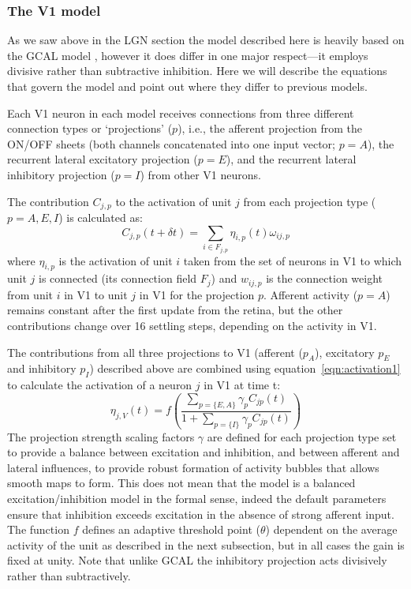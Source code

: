 \subsubsection*{The V1 model}

As we saw above in the LGN section the model described here is heavily
based on the GCAL model \citep{Stevens2013}, however it does differ in
one major respect---it employs divisive rather than subtractive
inhibition. Here we will describe the equations that govern the model
and point out where they differ to previous models.

Each V1 neuron in each model receives connections from three different
connection types or `projections' ($p$), i.e., the afferent projection
from the ON/OFF sheets (both channels concatenated into one input
vector; $p=A$), the recurrent lateral excitatory projection ($p=E$),
and the recurrent lateral inhibitory projection ($p=I$) from other V1
neurons.

The contribution $C_{j,p}$ to the activation of unit $j$ from each
projection type ($p=A,E,I$) is calculated as:
\begin{equation}
C_{j,p}(t+\delta t)=\sum_{i\in F_{j,p}}\eta_{i, p}(t)\omega_{ij,p}
\label{eqn:update}
\end{equation}
where $\eta_{i, p}$ is the activation of unit $i$ taken from the set
of neurons in V1 to which unit $j$ is connected (its connection field
$F_j$) and $w_{ij,p}$ is the connection weight from unit $i$ in V1 to
unit $j$ in V1 for the projection $p$. Afferent activity ($p=A$)
remains constant after the first update from the retina, but the other
contributions change over 16 settling steps, depending on the activity
in V1.

The contributions from all three projections to V1 (afferent
($p_{A}$), excitatory $p_{E}$ and inhibitory $p_{I}$) described above
are combined using equation~\ref{eqn:activation1} to calculate the
activation of a neuron $j$ in V1 at time t:
\begin{equation}
\eta_{j,V}(t)=f\left(\frac{\sum_{p=\{E, A\}}\gamma_{p}C_{jp}(t)}{1+\sum_{p=\{I\}}\gamma_{p}C_{jp}(t)}\right)
\label{eqn:activation1}
\end{equation}
The projection strength scaling factors $\gamma$ are defined for each
projection type set to provide a balance between excitation and
inhibition, and between afferent and lateral influences, to provide
robust formation of activity bubbles that allows smooth maps to
form. This does not mean that the model is a balanced
excitation/inhibition model in the formal sense, indeed the default
parameters ensure that inhibition exceeds excitation in the absence of
strong afferent input. The function $f$ defines an adaptive threshold
point ($\theta$) dependent on the average activity of the unit as
described in the next subsection, but in all cases the gain is fixed
at unity. Note that unlike GCAL the inhibitory projection acts
divisively rather than subtractively.

